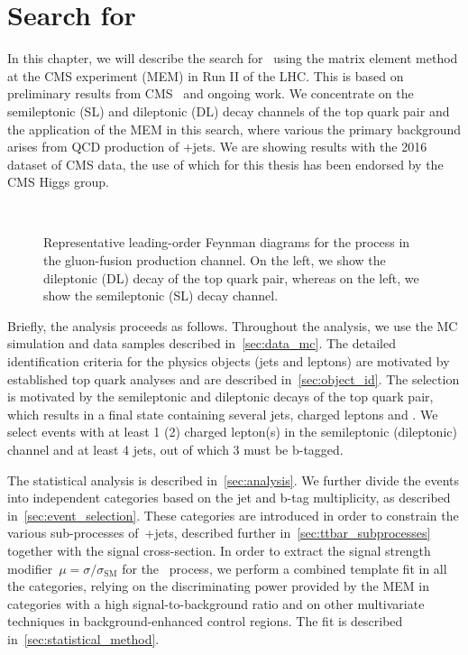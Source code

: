\chapter{Search for \ttHbb}

In this chapter, we will describe the search for~\ttHbb\xspace using the matrix element method at the CMS experiment (MEM) in Run II of the LHC. This is based on preliminary results from CMS~\cite{CMS:2016qwm,CMS:2016zbb} and ongoing work. We concentrate on the semileptonic (SL) and dileptonic (DL) decay channels of the top quark pair and the application of the MEM in this search, where various the primary background arises from QCD production of \ttbar+jets. We are showing results with the 2016 dataset of CMS data, the use of which for this thesis has been endorsed by the CMS Higgs group.

\begin{figure}
\begin{centering}
 \\
\caption[Representative leading-order Feynman diagrams for the \ttHbb\xspace process]{Representative leading-order Feynman diagrams for the \ttHbb\xspace process in the gluon-fusion production channel. On the left, we show the dileptonic (DL) decay of the top quark pair, whereas on the left, we show the semileptonic (SL) decay channel.}
\label{fig:tth_diagrams}
\end{centering}
\end{figure}

Briefly, the analysis proceeds as follows. Throughout the analysis, we use the MC simulation and data samples described in~\cref{sec:data_mc}. The detailed identification criteria for the physics objects (jets and leptons) are motivated by established top quark analyses and are described in~\cref{sec:object_id}. The selection is motivated by the semileptonic and dileptonic decays of the top quark pair, which results in a final state containing several jets, charged leptons and \MET. We select events with at least 1 (2) charged lepton(s) in the semileptonic (dileptonic) channel and at least 4 jets, out of which 3 must be b-tagged.

The statistical analysis is described in~\cref{sec:analysis}. We further divide the events into independent categories based on the jet and b-tag multiplicity, as described in~\cref{sec:event_selection}. These categories are introduced in order to constrain the various sub-processes of~\ttbar+jets, described further in~\cref{sec:ttbar_subprocesses} together with the \ttH signal cross-section. In order to extract the signal strength modifier~$\mu = \sigma/\sigma_{\mathrm{SM}}$ for the \ttH~process, we perform a combined template fit in all the categories, relying on the discriminating power provided by the MEM in categories with a high signal-to-background ratio and on other multivariate techniques in background-enhanced control regions. The fit is described in~\cref{sec:statistical_method}.

